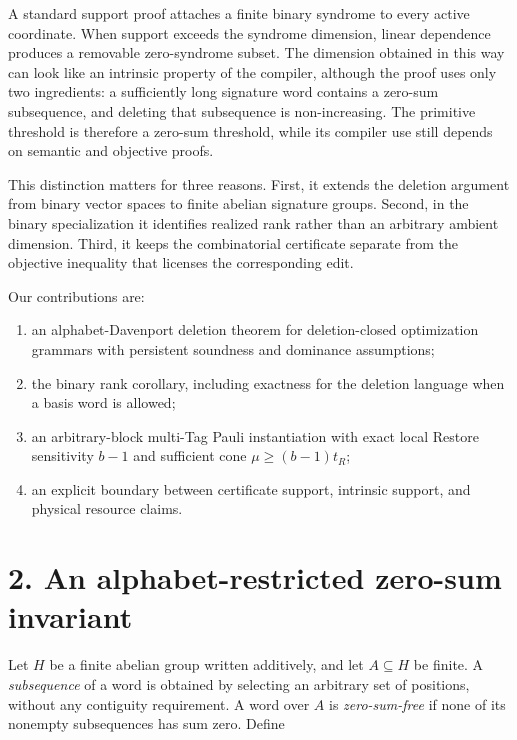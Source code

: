 \documentclass[
  11pt,
]{article}
\providecommand{\tightlist}{%
  \setlength{\itemsep}{0pt}\setlength{\parskip}{0pt}}
\begin{document}
A standard support proof attaches a finite binary syndrome to every
active coordinate. When support exceeds the syndrome dimension, linear
dependence produces a removable zero-syndrome subset. The dimension
obtained in this way can look like an intrinsic property of the
compiler, although the proof uses only two ingredients: a sufficiently
long signature word contains a zero-sum subsequence, and deleting that
subsequence is non-increasing. The primitive threshold is therefore a
zero-sum threshold, while its compiler use still depends on semantic and
objective proofs.

This distinction matters for three reasons. First, it extends the
deletion argument from binary vector spaces to finite abelian signature
groups. Second, in the binary specialization it identifies realized rank
rather than an arbitrary ambient dimension. Third, it keeps the
combinatorial certificate separate from the objective inequality that
licenses the corresponding edit.

Our contributions are:

\begin{enumerate}
\def\labelenumi{\arabic{enumi}.}
\tightlist
\item
  an alphabet-Davenport deletion theorem for deletion-closed
  optimization grammars with persistent soundness and dominance
  assumptions;
\item
  the binary rank corollary, including exactness for the deletion
  language when a basis word is allowed;
\item
  an arbitrary-block multi-Tag Pauli instantiation with exact local
  Restore sensitivity \(b-1\) and sufficient cone \(\mu\ge(b-1)t_R\);
\item
  an explicit boundary between certificate support, intrinsic support,
  and physical resource claims.
\end{enumerate}

\hypertarget{an-alphabet-restricted-zero-sum-invariant}{%
\section{2. An alphabet-restricted zero-sum
invariant}\label{an-alphabet-restricted-zero-sum-invariant}}

Let \(H\) be a finite abelian group written additively, and let
\(A\subseteq H\) be finite. A \emph{subsequence} of a word is obtained
by selecting an arbitrary set of positions, without any contiguity
requirement. A word over \(A\) is \emph{zero-sum-free} if none of its
nonempty subsequences has sum zero. Define
\end{document}
